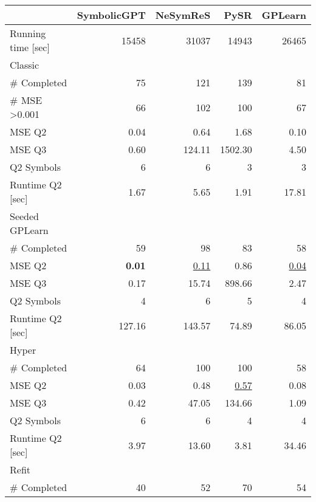 \begin{tabularx}{\textwidth}{lRRRR}
\toprule
  &  SymbolicGPT  &  NeSymReS  &  PySR  &  GPLearn  \\ 
\midrule
Running time [sec]  &  15458  &  31037  &  14943  &  26465  \\ 
Classic  &     &     &     &     \\ 
\qquad  \# Completed  &  75\phantom{.00}  &  121\phantom{.00}  &  139\phantom{.00}  &  81\phantom{.00}  \\ 
\qquad  \# MSE >0.001  &  66\phantom{.00}  &  102\phantom{.00}  &  100\phantom{.00}  &  67\phantom{.00}  \\ 
\qquad MSE Q2  &  0.04  &  0.64  &  1.68  &  0.10  \\ 
\qquad MSE Q3  &  0.60  &  124.11  &  1502.30  &  4.50  \\ 
\qquad Q2 Symbols  &  6\phantom{.00}  &  6\phantom{.00}  &  3\phantom{.00}  &  3\phantom{.00}  \\ 
\qquad Runtime Q2 [sec]  &  1.67  &  5.65  &  1.91  &  17.81  \\ 
Seeded GPLearn  &     &     &     &     \\ 
\qquad  \# Completed  &  59\phantom{.00}  &  98\phantom{.00}  &  83\phantom{.00}  &  58\phantom{.00}  \\ 
\qquad MSE Q2  &  \textbf{0.01}  &  \underline{0.11}  &  0.86  &  \underline{0.04}  \\ 
\qquad MSE Q3  &  0.17  &  15.74  &  898.66  &  2.47  \\ 
\qquad Q2 Symbols  &  4\phantom{.00}  &  6\phantom{.00}  &  5\phantom{.00}  &  4\phantom{.00}  \\ 
\qquad Runtime Q2 [sec]  &  127.16  &  143.57  &  74.89  &  86.05  \\ 
Hyper  &     &     &     &     \\ 
\qquad  \# Completed  &  64\phantom{.00}  &  100\phantom{.00}  &  100\phantom{.00}  &  58\phantom{.00}  \\ 
\qquad MSE Q2  &  0.03  &  0.48  &  \underline{0.57}  &  0.08  \\ 
\qquad MSE Q3  &  0.42  &  47.05  &  134.66  &  1.09  \\ 
\qquad Q2 Symbols  &  6\phantom{.00}  &  6\phantom{.00}  &  4\phantom{.00}  &  4\phantom{.00}  \\ 
\qquad Runtime Q2 [sec]  &  3.97  &  13.60  &  3.81  &  34.46  \\ 
Refit  &     &     &     &     \\ 
\qquad  \# Completed  &  40\phantom{.00}  &  52\phantom{.00}  &  70\phantom{.00}  &  54\phantom{.00}  \\ 

\end{tabularx}
